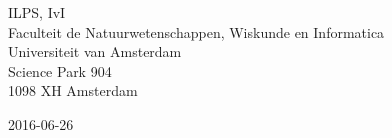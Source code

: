 \begin{center}
ILPS, IvI\\
Faculteit de Natuurwetenschappen, Wiskunde en Informatica\\
Universiteit van Amsterdam\\
Science Park 904\\
1098 XH  Amsterdam

\vspace{1.5cm}

2016-06-26

\end{center}
